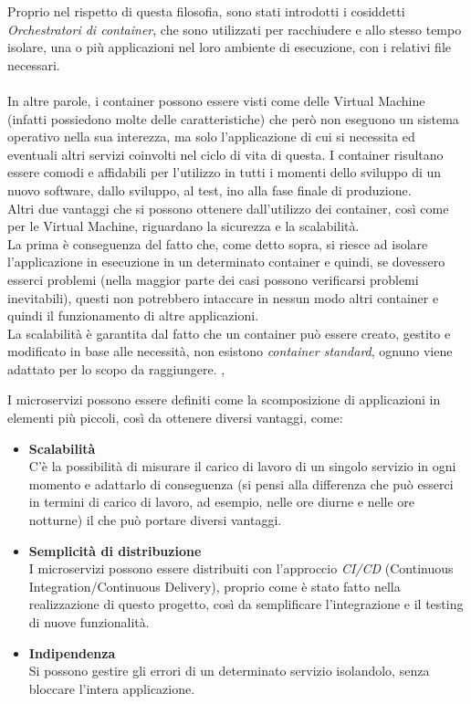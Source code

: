 Proprio nel rispetto di questa filosofia, sono stati introdotti i cosiddetti \emph{Orchestratori di container}, che sono utilizzati per racchiudere e allo stesso tempo 
isolare, una o più applicazioni nel loro ambiente di esecuzione, con i relativi file necessari.\\ \\
In altre parole, i container possono essere visti come delle Virtual Machine (infatti possiedono molte delle caratteristiche) che però non eseguono un sistema operativo 
nella sua interezza, ma solo l'applicazione di cui si necessita ed eventuali altri servizi coinvolti nel ciclo di vita di questa.
I container risultano essere comodi e affidabili per l'utilizzo in tutti i momenti dello sviluppo di un nuovo software, dallo sviluppo, al test, 
ino alla fase finale di produzione.\\ Altri due vantaggi che si possono ottenere dall'utilizzo dei container, così come per le Virtual Machine, 
riguardano la sicurezza e la scalabilità.\\
La prima è conseguenza del fatto che, come detto sopra, si riesce ad isolare l'applicazione in esecuzione in un determinato container e quindi, se dovessero esserci 
problemi (nella maggior parte dei casi possono verificarsi problemi inevitabili), questi non potrebbero intaccare in nessun modo altri container e quindi il funzionamento 
di altre applicazioni.\\
La scalabilità è garantita dal fatto che un container può essere creato, gestito e modificato in base alle necessità, non esistono \emph{container standard}, ognuno 
viene adattato per lo scopo da raggiungere. \cite{RedHatMicroservices}, \cite{Amazon}

I microservizi possono essere definiti come la scomposizione di applicazioni in elementi più piccoli, così da ottenere diversi vantaggi, come:
\begin{itemize}
\item \textbf{Scalabilità}\\ C'è la possibilità di misurare il carico di lavoro di un singolo servizio in ogni momento e adattarlo di conseguenza (si pensi alla differenza 
che può esserci in termini di carico di lavoro, ad esempio, nelle ore diurne e nelle ore notturne) il che può portare diversi vantaggi.
\item \textbf{Semplicità di distribuzione}\\ I microservizi possono essere distribuiti con l'approccio \emph{CI/CD} (Continuous Integration/Continuous Delivery), 
proprio come è stato fatto nella realizzazione di questo progetto, così da semplificare l'integrazione e il testing di nuove funzionalità.
\item \textbf{Indipendenza}\\ Si possono gestire gli errori di un determinato servizio isolandolo, senza bloccare l'intera applicazione.
\end{itemize}

